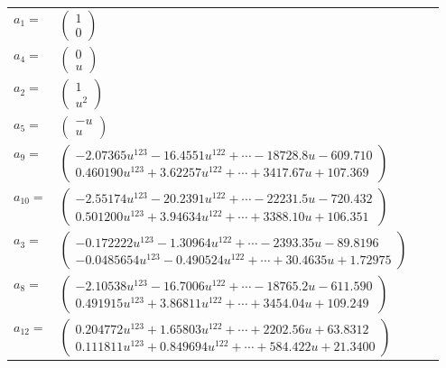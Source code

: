 \documentclass[1p]{elsarticle_modified}
\theoremstyle{definition}
\begin{document}
\begin{tabular}{m{7pt} m{180pt} m{7pt} m{180pt} }
\flushright $a_{1}=$&$\begin{pmatrix}1\\0\end{pmatrix}$ \\
\flushright $a_{4}=$&$\begin{pmatrix}0\\u\end{pmatrix}$ \\
\flushright $a_{2}=$&$\begin{pmatrix}1\\u^2\end{pmatrix}$ \\
\flushright $a_{5}=$&$\begin{pmatrix}- u\\u\end{pmatrix}$ \\
\flushright $a_{9}=$&$\begin{pmatrix}-2.07365 u^{123}-16.4551 u^{122}+\cdots-18728.8 u-609.710\\0.460190 u^{123}+3.62257 u^{122}+\cdots+3417.67 u+107.369\end{pmatrix}$ \\
\flushright $a_{10}=$&$\begin{pmatrix}-2.55174 u^{123}-20.2391 u^{122}+\cdots-22231.5 u-720.432\\0.501200 u^{123}+3.94634 u^{122}+\cdots+3388.10 u+106.351\end{pmatrix}$ \\
\flushright $a_{3}=$&$\begin{pmatrix}-0.172222 u^{123}-1.30964 u^{122}+\cdots-2393.35 u-89.8196\\-0.0485654 u^{123}-0.490524 u^{122}+\cdots+30.4635 u+1.72975\end{pmatrix}$ \\
\flushright $a_{8}=$&$\begin{pmatrix}-2.10538 u^{123}-16.7006 u^{122}+\cdots-18765.2 u-611.590\\0.491915 u^{123}+3.86811 u^{122}+\cdots+3454.04 u+109.249\end{pmatrix}$ \\
\flushright $a_{12}=$&$\begin{pmatrix}0.204772 u^{123}+1.65803 u^{122}+\cdots+2202.56 u+63.8312\\0.111811 u^{123}+0.849694 u^{122}+\cdots+584.422 u+21.3400\end{pmatrix}$ \\

\end{tabular}
\end{document}
